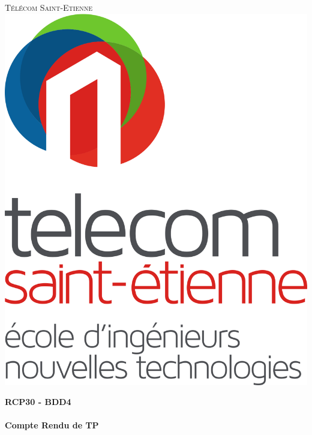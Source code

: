 \begin{titlepage}

    \begin{center}

        \textsc{\LARGE Télécom Saint-Etienne} \\[1cm]
        
        \includegraphics[scale=0.12]{image/logo_telecom.png}

        \hfill
        \vfill
    
        { \Huge \bfseries RCP30 - BDD4}\\[1.5cm]
        \HRule \\[0.4cm]
        { \huge \bfseries Compte Rendu de TP}\\[0.4cm] %
        \HRule \\[1.5cm]
         

\end{center}
\end{titlepage}
